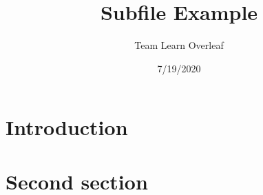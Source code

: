 \documentclass{article}
\title{Subfile Example}
\author{Team Learn Overleaf}
\date{ 7/19/2020 }
\begin{document}
    \maketitle

    \section{Introduction}

    

    \section{Second section}
    
\end{document}
